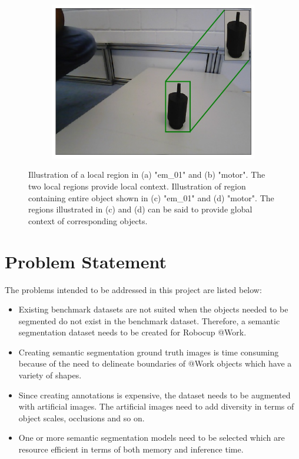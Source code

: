 \begin{figure}[h]
\begin{subfigure}{.4\textwidth}
			\caption{}
			\label{Fig:em01g}
		\end{subfigure}
		\begin{subfigure}{.4\textwidth}
			\centering
			\includegraphics[width=.9\linewidth]{images/motor_context_g}
			\caption{}
			\label{Fig:motorg}
		\end{subfigure}
		\caption{Illustration of a local region in (a) "em\_01" and (b) "motor". The two local regions provide local context. Illustration of region containing entire object shown in (c) "em\_01" and (d) "motor". The regions illustrated in (c) and (d) can be said to provide global context of corresponding objects.}
		\label{Fig:context}
	\end{figure}

\section{Problem Statement}

The problems intended to be addressed in this project are listed below:

	\begin{itemize}
		\item Existing benchmark datasets are not suited when the objects needed to be segmented do not exist in the benchmark dataset. Therefore, a semantic segmentation dataset needs to be created for Robocup @Work.
		\item Creating semantic segmentation ground truth images is time consuming because of the need to delineate boundaries of @Work objects which have a variety of shapes.
		\item Since creating annotations is expensive, the dataset needs to be augmented with artificial images. The artificial images need to add diversity in terms of object scales, occlusions and so on.
		\item One or more semantic segmentation models need to be selected which are resource efficient in terms of both memory and inference time. 
	\end{itemize}